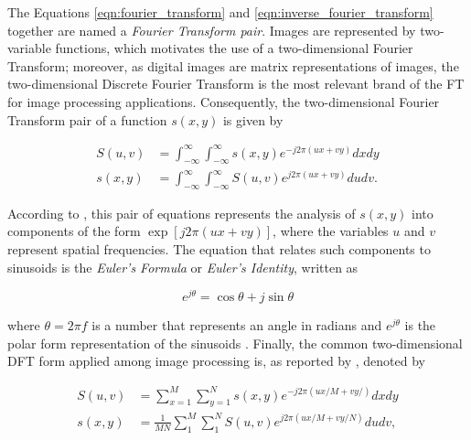 The Equations \ref{eqn:fourier_transform} and \ref{eqn:inverse_fourier_transform} together are named a \emph{Fourier Transform pair}. Images are represented by two-variable functions, which motivates the use of a two-dimensional Fourier Transform; moreover, as digital images are matrix representations of images, the two-dimensional Discrete Fourier Transform is the most relevant brand of the FT for image processing applications. Consequently, the two-dimensional Fourier Transform pair of a function $s(x,y)$ is given by

\begin{align}
\label{eqn:two_dimensional_continuous_fourier_transform}
S(u,v) &= \int_{-\infty}^{\infty}
         \int_{-\infty}^{\infty}
         s(x,y) e^{-j 2 \pi 
                    \left(
                        ux + vy
                    \right)
                  }
        dx dy\\
s(x,y) &= \int_{-\infty}^{\infty}
         \int_{-\infty}^{\infty}
         S(u,v) e^{j 2 \pi 
                    \left(
                        ux + vy
                    \right)
                  }
        du dv.
\end{align}

According to , this pair of equations represents the analysis of $s(x,y)$ into components of the form $\exp{\left[j 2 \pi (ux + vy) \right]}$, where the variables $u$ and $v$ represent spatial frequencies. The equation that relates such components to sinusoids is the \emph{Euler's Formula} or \emph{Euler's Identity}, written as

\begin{equation}
\label{eqn:euler_formula}
    e^{j\theta} = \cos{\theta} + j\sin{\theta}
\end{equation}

\noindent where $\theta = 2 \pi f$ is a number that represents an angle in radians and $e^{j\theta}$ is the polar form representation of the sinusoids \cite{gonzalez2018digital}. Finally, the common two-dimensional DFT form applied among image processing is, as reported by , denoted by

\begin{align}
\label{eqn:two_dimensional_discrete_fourier_transform}
S(u,v) &= \sum_{x = 1}^{M}
          \sum_{y = 1}^{N}
          s(x,y) e^{-j 2 \pi 
                    \left(
                        ux/M + vy/
                    \right)
                  }
        dx dy\\
s(x,y) &= \frac{1}{MN}
          \sum_{1}^{M}
          \sum_{1}^{N}
          S(u,v) e^{j 2 \pi 
                    \left(
                        ux/M + vy/N
                    \right)
                  }
        du dv,
\end{align}

